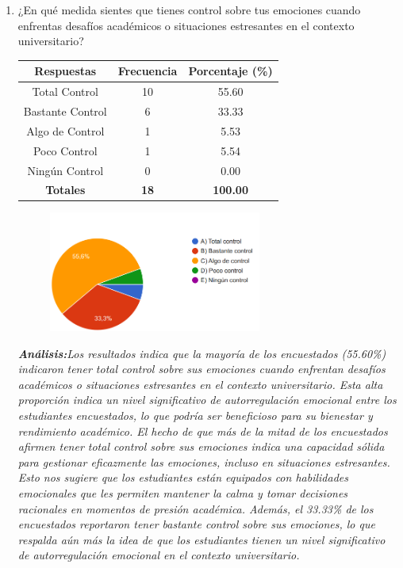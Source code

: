 \documentclass[journal]{IEEEtran}
\begin{document}
\begin{enumerate}
\item ¿En qué medida sientes que tienes control sobre tus emociones cuando enfrentas desafíos académicos o situaciones estresantes en el contexto universitario?
	\begin{table}[H]
		\renewcommand{\arraystretch}{1.3}
		\centering
		\begin{tabular}{|c|c|c|}
			\hline
			\textbf{Respuestas} & \textbf{Frecuencia} & \textbf{Porcentaje (\%)}\\
			\hline
			Total Control & 10 & 55.60 \\
			Bastante Control & 6 & 33.33 \\
			Algo de Control & 1 & 5.53\\
			Poco Control & 1 & 5.54\\
			Ningún Control & 0 & 0.00\\
			\hline
			\textbf{Totales} &\textbf{18}& \textbf{100.00}\\
			\hline
		\end{tabular}
	\end{table}
	\begin{figure}[h]
		\centering
		\includegraphics[width=07cm]{Pregunta 3}
	\end{figure}
	\textit{\textbf{Análisis:}Los resultados indica que la mayoría de los encuestados (55.60\%) indicaron tener total control sobre sus emociones cuando enfrentan desafíos académicos o situaciones estresantes en el contexto universitario. Esta alta proporción indica un nivel significativo de autorregulación emocional entre los estudiantes encuestados, lo que podría ser beneficioso para su bienestar y rendimiento académico.
El hecho de que más de la mitad de los encuestados afirmen tener total control sobre sus emociones indica una capacidad sólida para gestionar eficazmente las emociones, incluso en situaciones estresantes. Esto nos sugiere que los estudiantes están equipados con habilidades emocionales que les permiten mantener la calma y tomar decisiones racionales en momentos de presión académica.
Además, el 33.33\% de los encuestados reportaron tener bastante control sobre sus emociones, lo que respalda aún más la idea de que los estudiantes tienen un nivel significativo de autorregulación emocional en el contexto universitario.
}\\


\end{enumerate}
\end{document}
